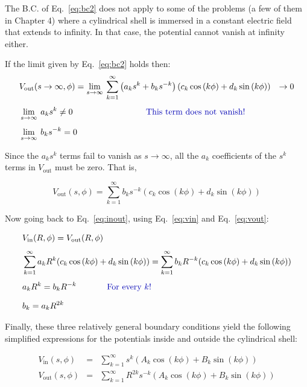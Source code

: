\documentclass[12pt]{article}
\begin{document}
\begin{flushleft}
The B.C. of Eq.~\ref{eq:bc2} does not apply to some of the problems (a few of them in Chapter 4) where a cylindrical shell is immersed in a constant electric field that extends to infinity.  In that case, the potential cannot vanish at infinity either.

If the limit given by Eq.~\ref{eq:bc2} holds then:
\begin{align}
& V_{\text{out}}(s\rightarrow \infty, \phi)=\lim\limits_{s \to \infty} \: \sum_{k=1}^{\infty}  \left(  a_{k}s^{k} + b_{k}s^{-k} \right) ( c_{k} \cos{(k\phi)}+d_{k}\sin{(k\phi)} )\hspace{.1in} \rightarrow 0 \notag \\[4pt]
& \lim\limits_{s \to \infty} \: a_{k}s^{k}  \ne 0 \hspace{1.2in} \text{\color{myblue} This term does not vanish!} \notag \\[4pt]
& \lim\limits_{s \to \infty} \: b_{k}s^{-k} = 0 \notag 
\end{align}

Since the $a_{k}s^{k}$ terms fail to vanish as $s\rightarrow \infty$, all the $a_{k}$ coefficients of the $s^{k} $ terms in $V_{\text{out}}$ must be zero.  That is,

\begin{equation}
 V_{\text{out}}(s,\phi) =  \sum_{k=1}^{\infty} b_{k}s^{-k} ( c_{k} \cos{(k\phi)}+d_{k}\sin{(k\phi)} )
\label{eq:vout}
\end{equation}

Now going back to Eq.~\ref{eq:inout}, using Eq.~\ref{eq:vin} and Eq.~\ref{eq:vout}:

\begin{align}
& V_{\text{in}}(R,\phi) = V_{\text{out}}(R,\phi) \notag \\[4pt]
& \sum_{k=1}^{\infty} a_{k}R^{k} ( c_{k} \cos{(k\phi)}+d_{k}\sin{(k\phi)} ) = \sum_{k=1}^{\infty} b_{k}R^{-k} ( c_{k} \cos{(k\phi)}+d_{k}\sin{(k\phi)} ) \notag \\[4pt]
& a_{k}R^{k} = b_{k}R^{-k} \hspace{.5in} \text{\color{myblue} For every $k$!} \notag \\[6pt]
& b_{k} = a_{k}R^{2k} \label{eq:albl}
\end{align}

Finally, these three relatively general boundary conditions yield the following simplified expressions for the potentials inside and outside the cylindrical shell:

\begin{eqnarray}
V_{\text{in}}(s,\phi) & = & \sum_{k=1}^{\infty}  s^{k} ( A_{k} \cos{(k\phi)}+B_{k}\sin{(k\phi)} )\label{eq:vinzeros}\\
V_{\text{out}}(s,\phi) &  = & \sum_{k=1}^{\infty} R^{2k}  s^{-k} ( A_{k} \cos{(k\phi)}+B_{k}\sin{(k\phi)} )\label{eq:voutzeros}
\end{eqnarray}


\end{flushleft}
\end{document}
